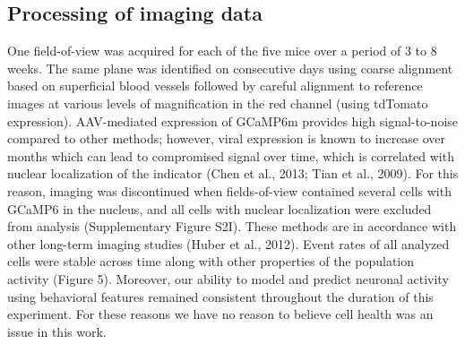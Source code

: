 \subsection{Processing of imaging data}
One field-of-view was acquired for each of the five mice over a period of 3 to 8 weeks. The same plane was identified on consecutive days using coarse alignment based on superficial blood vessels followed by careful alignment to reference images at various levels of magnification in the red channel (using tdTomato expression). AAV-mediated expression of GCaMP6m provides high signal-to-noise compared to other methods; however, viral expression is known to increase over months which can lead to compromised signal over time, which is correlated with nuclear localization of the indicator (Chen et al., 2013; Tian et al., 2009). For this reason, imaging was discontinued when fields-of-view contained several cells with GCaMP6 in the nucleus, and all cells with nuclear localization were excluded from analysis (Supplementary Figure S2I). These methods are in accordance with other long-term imaging studies (Huber et al., 2012). Event rates of all analyzed cells were stable across time along with other properties of the population activity (Figure 5). Moreover, our ability to model and predict neuronal activity using behavioral features remained consistent throughout the duration of this experiment. For these reasons we have no reason to believe cell health was an issue in this work. 

